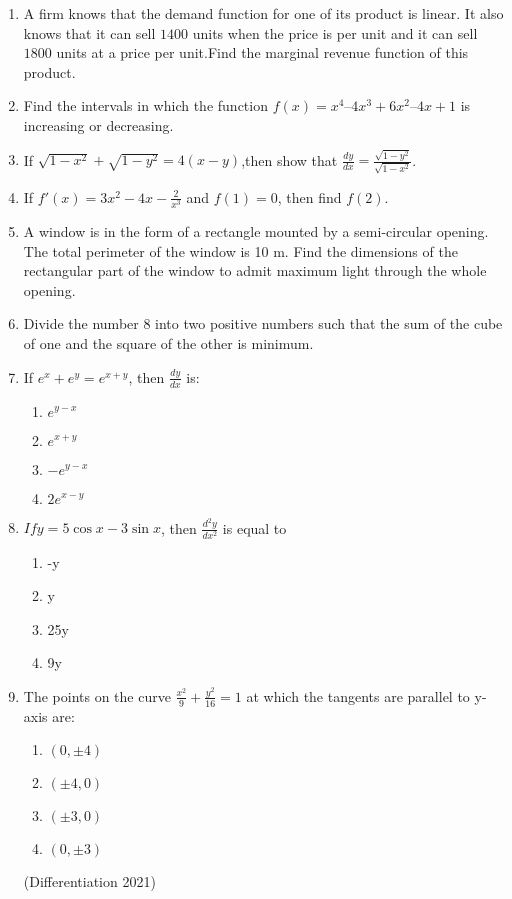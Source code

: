 
\begin{enumerate}
	\item A firm knows that the demand function for one of its product is linear. It also knows that it can sell $1400$ units when the price is  per unit and it can sell $1800$ units at a price  per unit.Find the marginal revenue function of this product.

\item Find the intervals in which the function $f(x) = x^{4}–4x^{3}+6x^{2}–4x+1$ is increasing or decreasing.

\item If $\sqrt{1-x^{2}}+\sqrt{1-y^{2}}=4(x-y)$,then show that $\frac{dy}{dx}=\frac{\sqrt{1-y^{2}}}{\sqrt{1-x^{2}}}$.


\item If $f'(x)=3x^{2}-4x-\frac{2}{x^{3}}$ and $f(1)=0$, then find $f(2)$.

\item A window is in the form of a rectangle mounted by a semi-circular opening. The total perimeter of the window is 10 m. Find the dimensions of the rectangular part of the window to admit maximum light through the whole opening.

\item Divide the number 8 into two positive numbers such that the sum of the cube of one and the square of the other is minimum.

\item If $e^{x}+e^{y}=e^{x+y}$, then $\frac{dy}{dx}$ is:
\begin{enumerate}
\item $e^{y-x}$
\item $e^{x+y}$
\item $-e^{y-x}$
\item $2 e^{x-y}$
\end{enumerate}

\item $If y=5\cos x-3\sin x$, then $\frac{d^{2}y}{dx^{2}}$ is equal to
\begin{enumerate}
\item -y
\item y
\item 25y
\item 9y
\end{enumerate}

\item The points on the curve $\frac{x^2}{9}+\frac{y^2}{16}=1$ at which the tangents are parallel to y-axis are:
\begin{enumerate}

\item $(0,\pm 4)$
\item $(\pm 4,0)$
\item $(\pm 3,0)$
\item $(0,\pm 3)$

\end{enumerate}
\hfill{(Differentiation 2021)}
\end{enumerate}
